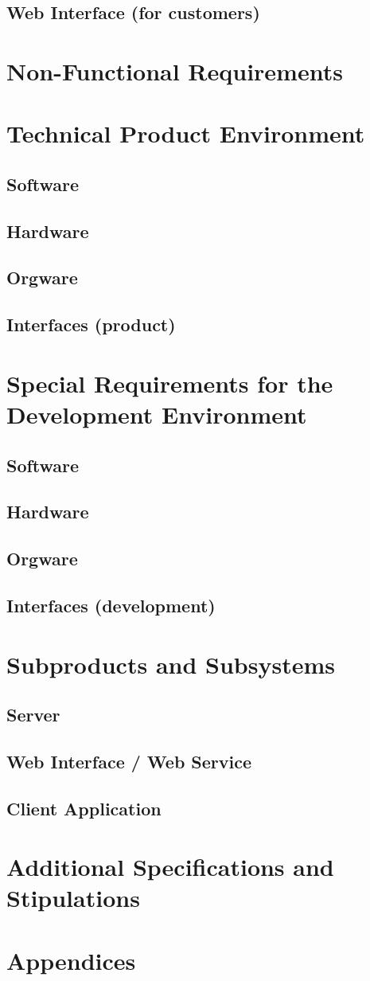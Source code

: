 \documentclass[11pt,a4paper,oneside,svgnames]{report}
\begin{document}
\section{Web Interface (for customers)}

\chapter{Non-Functional Requirements}
\chapter{Technical Product Environment}
\section{Software}
\section{Hardware}
\section{Orgware}
\section{Interfaces (product)}

\chapter{Special Requirements for the Development Environment}
\section{Software}
\section{Hardware}
\section{Orgware}
\section{Interfaces (development)}

\chapter{Subproducts and Subsystems}
\section{Server}
\section{Web Interface / Web Service}
\section{Client Application}

\chapter{Additional Specifications and Stipulations}
\chapter{Appendices}
\printglossaries
\end{document}
